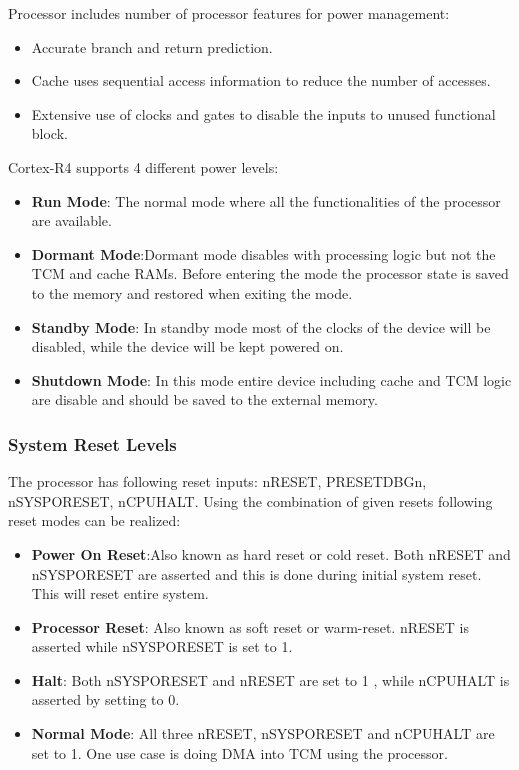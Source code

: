 Processor includes number of processor features for power management:
\begin{itemize}
	\item Accurate branch and return prediction.
	\item Cache uses sequential access information to reduce the number of accesses.
	\item Extensive use of clocks and gates to disable the inputs to unused functional block.
\end{itemize}

\begin{flushleft}
Cortex-R4 supports 4 different power levels:
\end{flushleft}
\begin{itemize}
	\item \textbf{Run Mode}: The normal mode where all the functionalities of the processor are available.
	\item \textbf{Dormant Mode}:Dormant mode disables with processing logic but not the TCM and cache RAMs. Before entering the mode the processor state is saved to the memory and restored when exiting the mode.
	\item \textbf{Standby Mode}: In standby mode most of the clocks of the device will be disabled, while the device will be kept powered on.
	\item \textbf{Shutdown Mode}: In this mode entire device including cache and TCM logic are disable and should be saved to the external memory.
\end{itemize}

\subsubsection{\textbf{System Reset Levels}}
The processor has following reset inputs: nRESET, PRESETDBGn, nSYSPORESET, nCPUHALT.
Using the combination of given resets following reset modes can be realized: 
\begin{itemize}
	\item \textbf{Power On Reset}:Also known as hard reset or cold reset. Both nRESET and nSYSPORESET are asserted and this is done during initial system reset. This will reset entire system.
	\item \textbf{Processor Reset}:
	Also known as soft reset or warm-reset. nRESET is asserted while nSYSPORESET is set to 1.
	\item \textbf{Halt}: Both nSYSPORESET and nRESET are set to 1 , while nCPUHALT is asserted by setting to 0.
	\item \textbf{Normal Mode}: All three nRESET, nSYSPORESET and nCPUHALT are set to 1. One use case is doing DMA into TCM using the processor.
\end{itemize}

